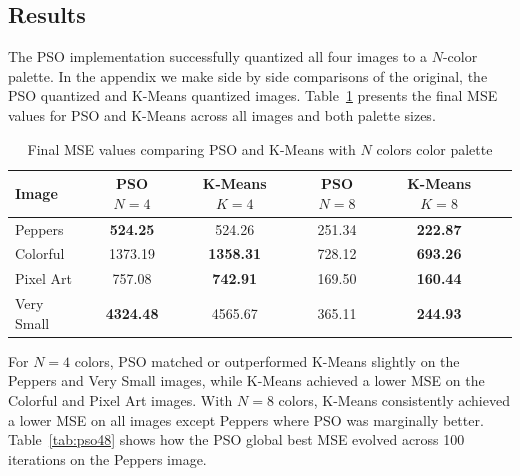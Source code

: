 \documentclass{article}
\begin{document}
\subsection{Results}
The PSO implementation successfully quantized all four images to a $N$-color palette. In the appendix we 
make side by side comparisons of the original, the PSO quantized and K-Means quantized images. Table~\ref{tab:finalmse} presents the final 
MSE values for PSO and K-Means across all images and both palette sizes. 
\begin{table}[H]
    \centering
    \begin{tabular}{lcc|ccc}
        \toprule
        \textbf{Image} & \textbf{PSO $N=4$} & \textbf{K-Means $K=4$} & \textbf{PSO $N=8$} & \textbf{K-Means $K=8$}\\
        \midrule
        Peppers & \textbf{524.25} & 524.26 & 251.34 & \textbf{222.87}\\
        Colorful & 1373.19 & \textbf{1358.31} & 728.12 & \textbf{693.26}\\
        Pixel Art & 757.08 & \textbf{742.91} & 169.50 & \textbf{160.44}\\
        Very Small & \textbf{4324.48} & 4565.67 & 365.11 & \textbf{244.93}\\
        \bottomrule
    \end{tabular}
    \caption{Final MSE values comparing PSO and K-Means with $N$ colors color palette}
    \label{tab:finalmse}
\end{table}
For $N=4$ colors, PSO matched or outperformed K-Means slightly on the Peppers and Very Small images, while K-Means 
achieved a lower MSE on the Colorful and Pixel Art images. With $N=8$ colors, K-Means consistently achieved a lower 
MSE on all images except Peppers where PSO was marginally better. Table~\ref{tab:pso48} shows 
how the PSO global best MSE evolved across 100 iterations on the Peppers image.
\end{document}
